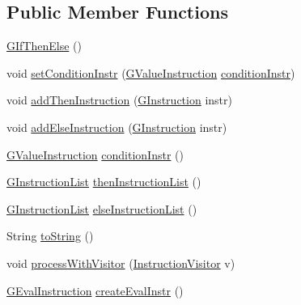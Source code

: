 \subsection*{Public Member Functions}
\begin{DoxyCompactItemize}
\item 
\hyperlink{classorg_1_1tzi_1_1use_1_1gen_1_1assl_1_1statics_1_1_g_if_then_else_a1d031af0fcf9609e959f99574cba70a9}{G\-If\-Then\-Else} ()
\item 
void \hyperlink{classorg_1_1tzi_1_1use_1_1gen_1_1assl_1_1statics_1_1_g_if_then_else_a113fcc323ba7f27de2dd11ba862010c6}{set\-Condition\-Instr} (\hyperlink{interfaceorg_1_1tzi_1_1use_1_1gen_1_1assl_1_1statics_1_1_g_value_instruction}{G\-Value\-Instruction} \hyperlink{classorg_1_1tzi_1_1use_1_1gen_1_1assl_1_1statics_1_1_g_if_then_else_ae9cbe7a67c508e7f3d7d380960547684}{condition\-Instr})
\item 
void \hyperlink{classorg_1_1tzi_1_1use_1_1gen_1_1assl_1_1statics_1_1_g_if_then_else_a65cdbba1c92085cb63686f615f635cf0}{add\-Then\-Instruction} (\hyperlink{interfaceorg_1_1tzi_1_1use_1_1gen_1_1assl_1_1statics_1_1_g_instruction}{G\-Instruction} instr)
\item 
void \hyperlink{classorg_1_1tzi_1_1use_1_1gen_1_1assl_1_1statics_1_1_g_if_then_else_a4aa2c05a6235f57196f5a0160d3d5d41}{add\-Else\-Instruction} (\hyperlink{interfaceorg_1_1tzi_1_1use_1_1gen_1_1assl_1_1statics_1_1_g_instruction}{G\-Instruction} instr)
\item 
\hyperlink{interfaceorg_1_1tzi_1_1use_1_1gen_1_1assl_1_1statics_1_1_g_value_instruction}{G\-Value\-Instruction} \hyperlink{classorg_1_1tzi_1_1use_1_1gen_1_1assl_1_1statics_1_1_g_if_then_else_ae9cbe7a67c508e7f3d7d380960547684}{condition\-Instr} ()
\item 
\hyperlink{classorg_1_1tzi_1_1use_1_1gen_1_1assl_1_1statics_1_1_g_instruction_list}{G\-Instruction\-List} \hyperlink{classorg_1_1tzi_1_1use_1_1gen_1_1assl_1_1statics_1_1_g_if_then_else_a43f5fed85cffcad31acf039dd272462a}{then\-Instruction\-List} ()
\item 
\hyperlink{classorg_1_1tzi_1_1use_1_1gen_1_1assl_1_1statics_1_1_g_instruction_list}{G\-Instruction\-List} \hyperlink{classorg_1_1tzi_1_1use_1_1gen_1_1assl_1_1statics_1_1_g_if_then_else_a2e5543966a25157283da701dd589b9ba}{else\-Instruction\-List} ()
\item 
String \hyperlink{classorg_1_1tzi_1_1use_1_1gen_1_1assl_1_1statics_1_1_g_if_then_else_a4fd1338f0705aa9c486968454f0ea0bc}{to\-String} ()
\item 
void \hyperlink{classorg_1_1tzi_1_1use_1_1gen_1_1assl_1_1statics_1_1_g_if_then_else_ae5c4457ee84671d4cdee580cbbcd1b11}{process\-With\-Visitor} (\hyperlink{interfaceorg_1_1tzi_1_1use_1_1gen_1_1assl_1_1statics_1_1_instruction_visitor}{Instruction\-Visitor} v)
\item 
\hyperlink{classorg_1_1tzi_1_1use_1_1gen_1_1assl_1_1dynamics_1_1_g_eval_instruction}{G\-Eval\-Instruction} \hyperlink{classorg_1_1tzi_1_1use_1_1gen_1_1assl_1_1statics_1_1_g_if_then_else_aaf2c823effa5bca019213406e0f5ad2d}{create\-Eval\-Instr} ()
\end{DoxyCompactItemize}



